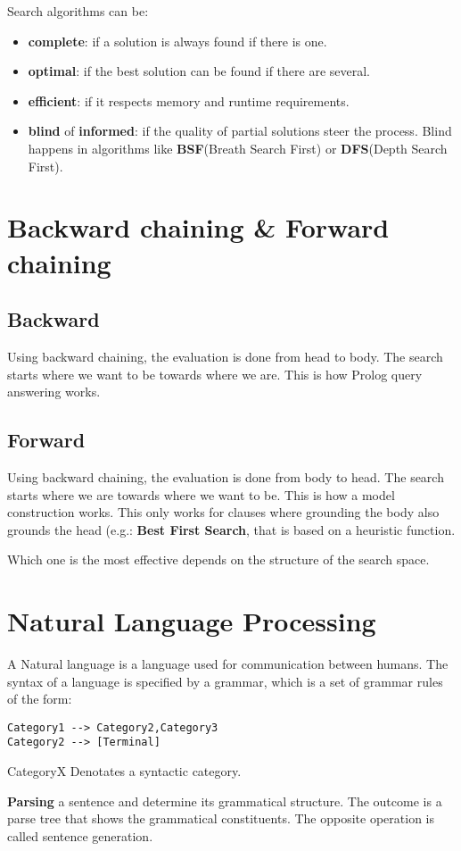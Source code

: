 \documentclass[12pt, oneside]{report}
\numberwithin{definition}{chapter}
\numberwithin{theorem}{chapter}
\numberwithin{lemma}{chapter}
\numberwithin{Rule}{chapter}
\numberwithin{equation}{chapter}
\begin{document}
Search algorithms can be:
\begin{itemize}
\item \textbf{complete}: if a solution is always found if there is one.
\item \textbf{optimal}: if the best solution can be found if there are several.
\item \textbf{efficient}: if it respects memory and runtime requirements.
\item \textbf{blind} of \textbf{informed}: if the quality of partial solutions steer the process. Blind happens in algorithms like \textbf{BSF}(Breath Search First) or \textbf{DFS}(Depth Search First).
\end{itemize}
\section{Backward chaining \& Forward chaining}
\subsection{Backward}
Using backward chaining, the evaluation is done from head to body. The search starts where we want to be towards where we are. This is how Prolog query answering works.
\subsection{Forward}
Using backward chaining, the evaluation is done from body to head. The search starts where we are towards where we want to be. This is how a model construction works. This only works for clauses where grounding the body also grounds the head (e.g.: \textbf{Best First Search}, that is based on a heuristic function.

Which one is the most effective depends on the structure of the search space.

\section{Natural Language Processing}
A Natural language is a language used for communication between humans. The syntax of a language is specified by a grammar, which is a set of grammar rules of the form:
\begin{verbatim}
Category1 --> Category2,Category3
Category2 --> [Terminal]
\end{verbatim}
CategoryX Denotates a syntactic category.

\textbf{Parsing} a sentence and determine its grammatical structure. The outcome is a parse tree that shows the grammatical constituents. The opposite operation is called sentence generation.
\end{document}
